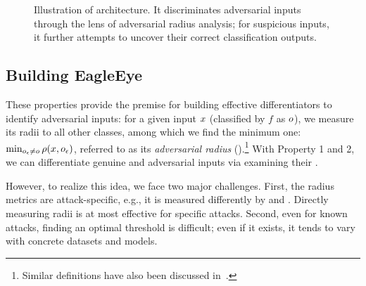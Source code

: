 %
%
%


%
%

\begin{figure*}
\centering
{}
\caption{Illustration of \system architecture. It discriminates adversarial inputs through the lens of adversarial radius analysis; for suspicious inputs, it further attempts to uncover their correct classification outputs. \label{fig:framework}}
\end{figure*}


\subsection{Building EagleEye}

These properties provide the premise for building effective differentiators to identify adversarial inputs: for a given input $x$ (classified by $f$ as $o$), we measure its radii to all other classes, among which we find the minimum one: $\min_{o_\epsilon \neq o} \rho(x, o_\epsilon)$, referred to as its {\em adversarial radius} (\ar).\footnote{Similar definitions have also been discussed in~\cite{Fawzi:2015:arxiv,Bastani:2016:arXiv,Feng:2016:arXiv}.} With Property 1 and 2, we can differentiate genuine and adversarial inputs via examining their \ars.

However, to realize this idea, we face two major challenges. First, the radius metrics are attack-specific, e.g., it is measured differently by \ttg and \ttpa. Directly measuring radii is at most effective for specific attacks. Second, even for known attacks, finding an optimal threshold is difficult; even if it exists, it tends to vary with concrete datasets and \dnn models.

